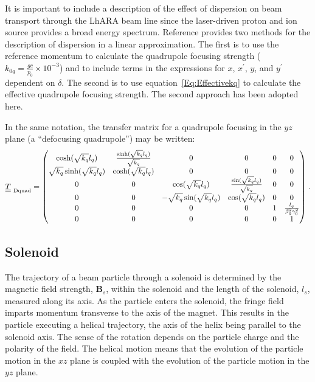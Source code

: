 It is important to include a description of the effect of dispersion
on beam transport through the LhARA beam line since the laser-driven
proton and ion source provides a broad energy spectrum. 
Reference \cite{Wolski:2014} provides two methods for the description of
dispersion in a linear approximation.
The first is to use the reference momentum to calculate the quadrupole
focusing strength ($k_{0q} = \frac{gc}{p_0} \times 10^{-3}$) and to
include terms in the expressions for $x$, $x^\prime$, $y$, and
$y^\prime$ dependent on $\delta$.    
The second is to use equation~\ref{Eq:Effectivekq} to calculate the
effective quadrupole focusing strength.
The second approach has been adopted here.

In the same notation, the transfer matrix for a quadrupole focusing in
the $yz$ plane (a ``defocusing quadrupole'') may be written: 
\begin{equation}
  \underline{\underline{T}}_{\rm~Dquad} =
    \begin{pmatrix}
          \cosh(\sqrt{k_q} l_q) & \frac{\sinh(\sqrt{k_q} l_q)}{\sqrt{k_q}} & 0 & 0             & 0 & 0 \\
 \sqrt{k_q} \sinh(\sqrt{k_q} l_q) &                  \cosh(\sqrt{k_q} l_q) & 0 & 0             & 0 & 0 \\
          0 & 0 &            \cos(\sqrt{k_q} l_q) &  \frac{\sin(\sqrt{k_q} l_q)}{\sqrt{k_q}} & 0 & 0 \\
          0 & 0 &  -\sqrt{k_q} \sin(\sqrt{k_q} l_q) &                   \cos(\sqrt{k_q} l_q) & 0 & 0 \\
          0 & 0 & 0 & 0 & 1 & \frac{l_q}{\beta_0^2 \gamma_0^2} \\
          0 & 0 & 0 & 0 & 0 &                             1
        \end{pmatrix} \, .
\end{equation}

\subsection{Solenoid}

The trajectory of a beam particle through a solenoid is determined by
the magnetic field strength, $\bm{B}_s$, within the solenoid and the
length of the solenoid, $l_s$, measured along its axis.
As the particle enters the solenoid, the fringe field imparts momentum
transverse to the axis of the magnet.
This results in the particle executing a helical trajectory, the axis
of the helix being parallel to the solenoid axis.
The sense of the rotation depends on the particle charge and the
polarity of the field.
The helical motion means that the evolution of the particle motion in
the $xz$ plane is coupled with the evolution of the particle motion in
the $yz$ plane.

